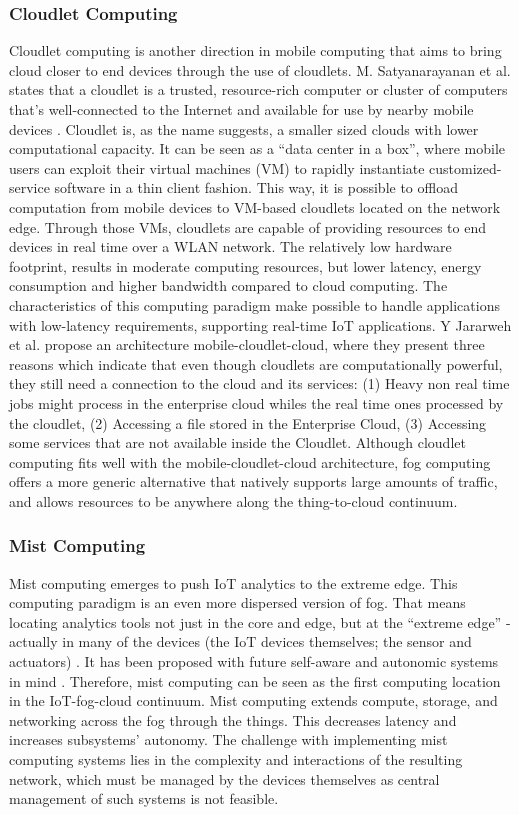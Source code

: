 \subsubsection{Cloudlet Computing}
Cloudlet computing is another direction in mobile computing that aims to bring cloud closer to end devices through the use of cloudlets. M. Satyanarayanan et al. states that a cloudlet is a trusted, resource-rich computer or cluster of computers that’s well-connected to the Internet and available for use by nearby mobile devices \cite{satyanarayanan2009case}. Cloudlet is, as the name suggests, a smaller sized clouds with lower computational capacity. It can be seen as a ``data center in a box'', where mobile users can exploit their virtual machines (VM) to rapidly instantiate customized-service software in a thin client fashion. This way, it is possible to offload computation from mobile devices to VM-based cloudlets located on the network edge. Through those VMs, cloudlets are capable of providing resources to end devices in real time over a WLAN network. The relatively low hardware footprint, results in moderate computing resources, but lower latency, energy consumption and higher bandwidth compared to cloud computing. The characteristics of this computing paradigm make possible to handle applications with low-latency requirements, supporting real-time IoT applications.
Y Jararweh et al. \cite{jararweh2013resource} propose an architecture mobile-cloudlet-cloud, where they present three reasons which indicate that even though cloudlets are computationally powerful, they still need a connection to the cloud and its services: (1) Heavy non real time jobs might process in the enterprise cloud whiles the real time ones processed by the cloudlet, (2) Accessing a file stored in the Enterprise Cloud, (3) Accessing some services that are not available inside the Cloudlet. Although cloudlet computing fits well with the mobile-cloudlet-cloud architecture, fog computing offers a more generic alternative that natively supports large amounts of traffic, and allows resources to be anywhere along the thing-to-cloud continuum.

\subsubsection{Mist Computing}
Mist computing emerges to push IoT analytics to the extreme edge. This computing paradigm is an even more dispersed version of fog. That means locating analytics tools not just in the core and edge, but at the ``extreme edge'' - actually in many of the devices (the IoT devices themselves; the sensor and actuators) \cite{Ciscopus95:online}. It has been proposed with future self-aware and autonomic systems in mind \cite{preden2015benefits}. Therefore, mist computing can be seen as the first computing location in the IoT-fog-cloud continuum. Mist computing extends compute, storage, and networking across the fog through the things. This decreases latency and increases subsystems’ autonomy. The challenge with implementing mist computing systems lies in the complexity and interactions of the resulting network, which must be managed by the devices themselves as central management of such systems is not feasible.

